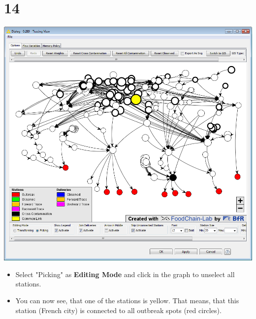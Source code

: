 \documentclass{beamer}
\begin{document}
\section{14}
\begin{frame}
	\begin{center}
  		\includegraphics[height=0.6\textheight]{14.png}
	\end{center}
	\begin{itemize}
		\item Select "Picking" as \textbf{Editing Mode} and click in the graph to unselect all stations.
		\item You can now see, that one of the stations is yellow. That means, that this station (French city) is connected to all outbreak spots (red circles).
	\end{itemize}
\end{frame}
\end{document}
